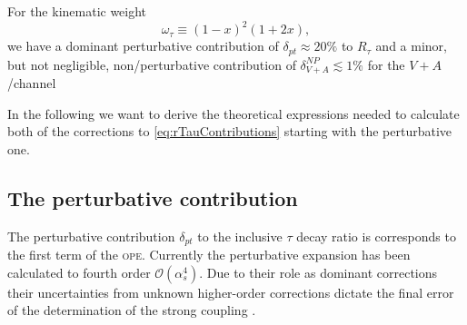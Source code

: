 \documentclass[../../index.tex]{subfiles}
\begin{document}
For the kinematic weight
\begin{equation}
  \omega_\tau \equiv (1-x)^2(1+2x),
\end{equation}
we have a dominant perturbative contribution of \(\delta_{pt} \approx 20\%\) to \(R_\tau\)
\cite{Pich2013} and a minor, but not negligible, non\-/perturbative contribution
of \(\delta_{V+A}^{NP} \lesssim  1\% \) \cite{Jamin2013} for the \(V+A\)\-/channel

In the following we want to derive the theoretical expressions needed to
calculate both of the corrections to \cref{eq:rTauContributions} starting with
the perturbative one.


\subsection{The perturbative contribution}
The perturbative contribution \(\delta_{pt}\) to the inclusive \(\tau\) decay
ratio is corresponds to the first term of the \textsc{ope}. Currently the
perturbative expansion has been calculated to fourth order
\(\mathcal{O}(\alpha_s^4)\). Due to their role as dominant corrections their
uncertainties from unknown higher-order corrections dictate the final error of
the determination of the strong coupling \cite{Pich2016}.
\end{document}
